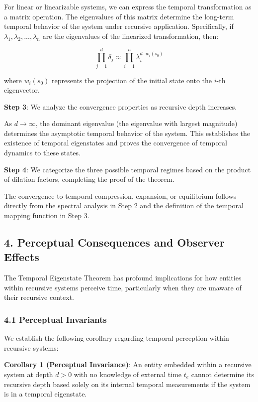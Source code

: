 \documentclass[
]{article}
\begin{document}
For linear or linearizable systems, we can express the temporal
transformation as a matrix operation. The eigenvalues of this matrix
determine the long-term temporal behavior of the system under recursive
application. Specifically, if \(\lambda_1, \lambda_2, ..., \lambda_n\)
are the eigenvalues of the linearized transformation, then:

\[\prod_{j=1}^{d} \delta_j \approx \prod_{i=1}^{n} \lambda_i^{d \cdot w_i(s_0)}\]

where \(w_i(s_0)\) represents the projection of the initial state onto
the \(i\)-th eigenvector.

\textbf{Step 3}: We analyze the convergence properties as recursive
depth increases.

As \(d \to \infty\), the dominant eigenvalue (the eigenvalue with
largest magnitude) determines the asymptotic temporal behavior of the
system. This establishes the existence of temporal eigenstates and
proves the convergence of temporal dynamics to these states.

\textbf{Step 4}: We categorize the three possible temporal regimes based
on the product of dilation factors, completing the proof of the theorem.

The convergence to temporal compression, expansion, or equilibrium
follows directly from the spectral analysis in Step 2 and the definition
of the temporal mapping function in Step 3.

\subsection{4. Perceptual Consequences and Observer
Effects}\label{perceptual-consequences-and-observer-effects}

The Temporal Eigenstate Theorem has profound implications for how
entities within recursive systems perceive time, particularly when they
are unaware of their recursive context.

\subsubsection{4.1 Perceptual Invariants}\label{perceptual-invariants}

We establish the following corollary regarding temporal perception
within recursive systems:

\textbf{Corollary 1 (Perceptual Invariance)}: An entity embedded within
a recursive system at depth \(d > 0\) with no knowledge of external time
\(t_e\) cannot determine its recursive depth based solely on its
internal temporal measurements if the system is in a temporal
eigenstate.
\end{document}
